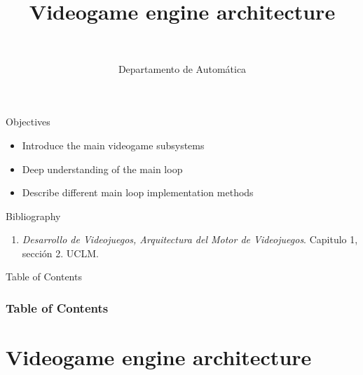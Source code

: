 \documentclass[10pt,compress]{beamer} %
\title[Videogame engine architecture]{Videogame engine architecture}
\author{\asignatura\\\carrera}
\institute{}
\date{Departamento de Automática}
\begin{document}
{\titlepageBlue
    \begin{frame}
        \titlepage
    \end{frame}
}

\institute{\asignatura}

\begin{frame}[plain]{}
   \begin{block}{Objectives}
   \begin{itemize}
        \item Introduce the main videogame subsystems
        \item Deep understanding of the main loop
        \item Describe different main loop implementation methods
	\end{itemize}
	\end{block}

   \begin{block}{Bibliography}
      \begin{enumerate}
          \item  \textit{Desarrollo de Videojuegos, Arquitectura del Motor de Videojuegos}. Capitulo 1, sección 2. UCLM.
      \end{enumerate} 
   \end{block}
\end{frame}

{
\begin{frame}[shrink]{Table of Contents}
 \frametitle{Table of Contents}
 \tableofcontents
\end{frame}
}

\section{Videogame engine architecture}
\end{document}
